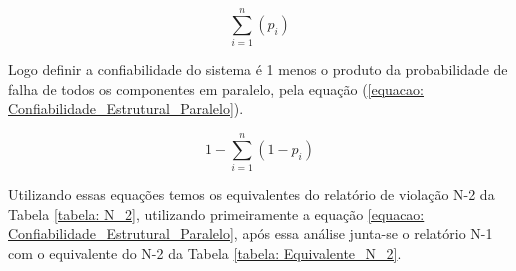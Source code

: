 \documentclass[lettersize,journal]{IEEEtran}
\begin{document}
\begin{equation}
	\sum_{i=1}^{n}(p_{i})
	\label{equacao: Confiabilidade_Estrutural_Serie}
\end{equation}

Logo definir a confiabilidade do sistema é 1 menos o produto da probabilidade de falha de todos os componentes em paralelo, pela equação (\ref{equacao: Confiabilidade_Estrutural_Paralelo}).

\begin{equation}
	1-\sum_{i=1}^{n}(1-p_{i})
	\label{equacao: Confiabilidade_Estrutural_Paralelo}
\end{equation}

Utilizando essas equações temos os equivalentes do relatório de violação N-2 da Tabela \ref{tabela: N_2}, utilizando primeiramente a equação \ref{equacao: Confiabilidade_Estrutural_Paralelo}, após essa análise junta-se o relatório N-1 com o equivalente do N-2 da Tabela \ref{tabela: Equivalente_N_2}.
\end{document}
